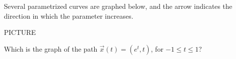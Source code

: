 \begin{problem}
Several parametrized curves are graphed below, and the arrow indicates the direction in which the parameter increases.

PICTURE

Which is the graph of the path $\vec{x}(t) = (e^t, t)$, for $-1\leq t\leq 1$?
\begin{multipleChoice}
\end{multipleChoice}
\end{problem}